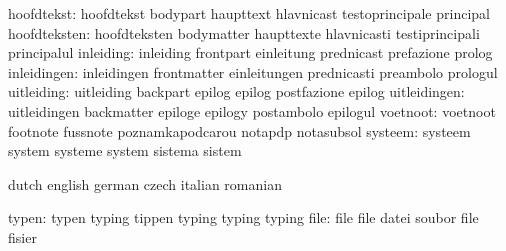                hoofdtekst: hoofdtekst                bodypart
                           haupttext                 hlavnicast
                           testoprincipale           principal %
             hoofdteksten: hoofdteksten              bodymatter
                           haupttexte                hlavnicasti
                           testiprincipali           principalul %
                inleiding: inleiding                 frontpart
                           einleitung                prednicast
                           prefazione                prolog
              inleidingen: inleidingen               frontmatter
                           einleitungen              prednicasti
                           preambolo                 prologul
               uitleiding: uitleiding                backpart
                           epilog                    epilog
                           postfazione               epilog %
             uitleidingen: uitleidingen              backmatter
                           epiloge                   epilogy
                           postambolo                epilogul %
                 voetnoot: voetnoot                  footnote
                           fussnote                  poznamkapodcarou
                           notapdp                   notasubsol
                  systeem: systeem                   system
                           systeme                   system
                           sistema                   sistem

\stopvariables

\startvariables            dutch                     english
                           german                    czech
                           italian                   romanian

                    typen: typen                     typing
                           tippen                    typing
                           typing                    typing %
                     file: file                      file
                           datei                     soubor
                           file                      fisier 

\stopvariables




